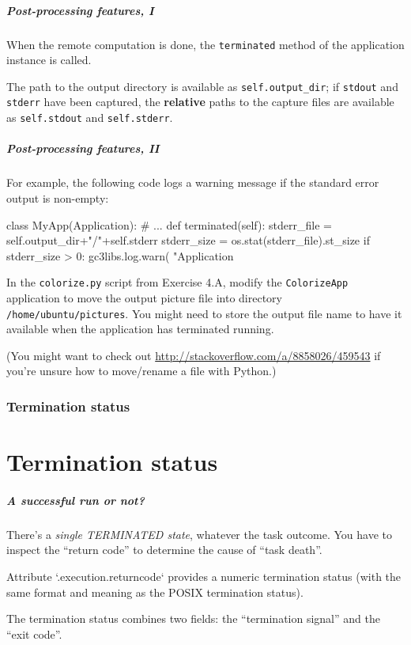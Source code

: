 \documentclass[english,serif,mathserif,xcolor=pdftex,dvipsnames,table]{beamer}
\begin{document}
\begin{frame}[fragile]
  \frametitle{Post-processing features, I}

  When the remote computation is done, the \texttt{terminated} method
  of the application instance is called.

  \+
  The path to the output directory is available as
  \lstinline|self.output_dir|; if \texttt{stdout} and \texttt{stderr}
  have been captured, the \textbf{relative} paths to the capture files
  are available as \lstinline|self.stdout| and
  \lstinline|self.stderr|.
\end{frame}


\begin{frame}[fragile]
  \frametitle{Post-processing features, II}

  For example, the following code logs a warning message if the
  standard error output is non-empty:
\begin{python}
class MyApp(Application):
  # ...
  def terminated(self):
    stderr_file = self.output_dir+"/"+self.stderr
    stderr_size = os.stat(stderr_file).st_size
    if stderr_size > 0:
      gc3libs.log.warn(
        "Application %
\end{python}
\end{frame}


\begin{frame}
  \begin{exercise*}[6.A]

    In the \texttt{colorize.py} script from Exercise 4.A, modify the
    \texttt{ColorizeApp} application to move the output picture file
    into directory \texttt{/home/ubuntu/pictures}.  You might need to
    store the output file name to have it available when the
    application has terminated running.

    \+
    (You might want to check out
    \url{http://stackoverflow.com/a/8858026/459543} if you're unsure
    how to move/rename a file with Python.)
  \end{exercise*}
\end{frame}


\section{Termination status}
\part{Termination status}

\begin{frame}
  \frametitle{A successful run or not?}

  There's a \emph{single TERMINATED state}, whatever the task outcome.
  You have to inspect the ``return code'' to determine the
  cause of ``task death''.

  \+
  Attribute `.execution.returncode` provides a numeric termination
  status (with the same format and meaning as the POSIX termination
  status).

  \+
  The termination status combines two fields: the ``termination
  signal'' and the ``exit code''.

\end{frame}
\end{document}
